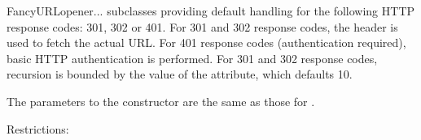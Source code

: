\begin{classdesc}{FancyURLopener}{...}
 subclasses  providing default
handling for the following HTTP response codes: 301, 302 or 401.  For
301 and 302 response codes, the  header is used to
fetch the actual URL.  For 401 response codes (authentication
required), basic HTTP authentication is performed.  For 301 and 302 response
codes, recursion is bounded by the value of the  attribute,
which defaults 10.

The parameters to the constructor are the same as those for
.

\end{classdesc}

Restrictions:

